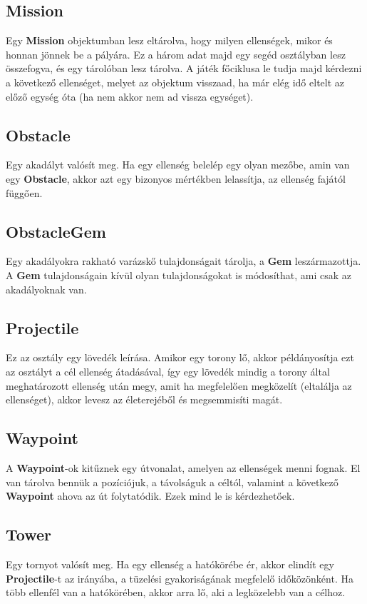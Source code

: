 \subsection{Mission}
Egy \textbf{Mission} objektumban lesz eltárolva, hogy milyen ellenségek, mikor és honnan jönnek be a pályára. Ez a három adat majd egy segéd osztályban lesz összefogva, és egy tárolóban lesz tárolva. A játék főciklusa le tudja majd kérdezni a következő ellenséget, melyet az objektum visszaad, ha már elég idő eltelt az előző egység óta (ha nem akkor nem ad vissza egységet).

\subsection{Obstacle}
Egy akadályt valósít meg. Ha egy ellenség belelép egy olyan mezőbe, amin van egy \textbf{Obstacle}, akkor azt egy bizonyos mértékben lelassítja, az ellenség fajától függően.

\subsection{ObstacleGem}
Egy akadályokra rakható varázskő tulajdonságait tárolja, a \textbf{Gem} leszármazottja. A \textbf{Gem} tulajdonságain kívül olyan tulajdonságokat is módosíthat, ami csak az akadályoknak van.

\subsection{Projectile}
Ez az osztály egy lövedék leírása. Amikor egy torony lő, akkor példányosítja ezt az osztályt a cél ellenség átadásával, így egy lövedék mindig a torony által meghatározott ellenség után megy, amit ha megfelelően megközelít (eltalálja az ellenséget), akkor levesz az életerejéből és megsemmisíti magát.

\subsection{Waypoint}
A \textbf{Waypoint}-ok kitűznek egy útvonalat, amelyen az ellenségek menni fognak. El van tárolva bennük a pozíciójuk, a távolságuk a céltól, valamint a következő \textbf{Waypoint} ahova az út folytatódik. Ezek mind le is kérdezhetőek.

\subsection{Tower}
Egy tornyot valósít meg. Ha egy ellenség a hatókörébe ér, akkor elindít egy \textbf{Projectile}-t az irányába, a tüzelési gyakoriságának megfelelő időközönként. Ha több ellenfél van a hatókörében, akkor arra lő, aki a legközelebb van a célhoz.

